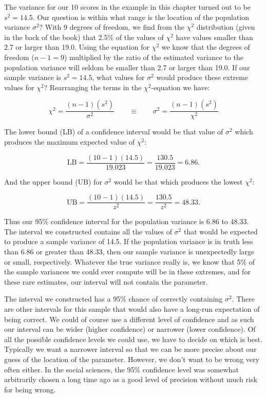 \documentclass[12pt]{article}
\begin{document}
The variance for our 10 scores in the example in this chapter turned out to be $s^2 = 14.5$. Our question is within what range is the location of the population variance $\sigma^2$? With 9 degrees of freedom, we find from the $\chi^2$ distribution (given in the back of the book) that 2.5\% of the values of $\chi^2$ have values smaller than 2.7 or larger than 19.0. Using the equation for $\chi^2$ we know that the degrees of freedom ($n - 1 = 9$) multiplied by the ratio of the estimated variance to the population variance will seldom be smaller than 2.7 or larger than 19.0. If our sample variance is $s^2 = 14.5$, what values for $\sigma^2$ would produce these extreme values for $\chi^2$? Rearranging the terms in the $\chi^2$-equation we have:

\[
\chi^2 = \frac{(n-1)(s^2)}{\sigma^2} \qquad \equiv \qquad \sigma^2 = \frac{(n-1)(s^2)}{\chi^2}
\]

The lower bound (LB) of a confidence interval would be that value of $\sigma^2$ which produces the maximum expected value of $\chi^2$:

\[
\text{LB} = \frac{(10-1)(14.5)}{19.023} = \frac{130.5}{19.023} = 6.86.
\]

And the upper bound (UB) for $\sigma^2$ would be that which produces the lowest $\chi^2$:

\newpage


\[
\text{UB} = \frac{(10-1)(14.5)}{z^2} = \frac{130.5}{z^2} = 48.33.
\]

Thus our 95\% confidence interval for the population variance is 6.86 to 48.33. The interval we constructed contains all the values of $\sigma^2$ that would be expected to produce a sample variance of 14.5. If the population variance is in truth less than 6.86 or greater than 48.33, then our sample variance is unexpectedly large or small, respectively. Whatever the true variance really is, we know that 5\% of the sample variances we could ever compute will be in these extremes, and for these rare estimates, our interval will not contain the parameter.

The interval we constructed has a 95\% chance of correctly containing $\sigma^2$. There are other intervals for this sample that would also have a long-run expectation of being correct. We could of course use a different level of confidence and as such our interval can be wider (higher confidence) or narrower (lower confidence). Of all the possible confidence levels we could use, we have to decide on which is best. Typically we want a narrower interval so that we can be more precise about our guess of the location of the parameter. However, we don't want to be wrong very often either. In the social sciences, the 95\% confidence level was somewhat arbitrarily chosen a long time ago as a good level of precision without much risk for being wrong.
\end{document}
